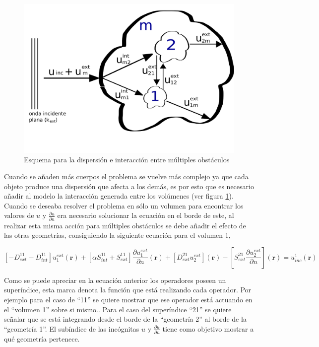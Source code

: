 \documentclass[12pt,letterpaper]{article}
\numberwithin{equation}{section}
\begin{document}
\begin{figure}[H]
	\centering\includegraphics[scale=0.5]{Imagenes/multi_obstaculos.png}
	\caption{Esquema para la dispersión e interacción entre múltiples obstáculos}
	\label{fig:esquema_multi_obstaculos}
\end{figure}

Cuando se añaden más cuerpos el problema se vuelve más complejo ya que cada objeto produce una dispersión que afecta a los demás, es por esto que es necesario añadir al modelo la interacción generada entre los volúmenes \cite{Multiple scattering} (ver figura \ref{fig:esquema_multi_obstaculos}). Cuando se deseaba resolver el problema en sólo un volumen para encontrar los valores de $u$ y $\frac{\partial u}{\partial n}$ era necesario solucionar la ecuación en el borde de este, al realizar esta misma acción para múltiples obstáculos se debe añadir el efecto de las otras geometrías, consiguiendo la siguiente ecuación para el volumen 1,

\begin{equation}
\left[-D_{ext}^{11} - D_{int}^{11}\right] u^{ext}_1(\textbf{r}) + \left[\alpha S_{int}^{11} + S_{ext}^{11}\right]\frac{\partial u^{ext}_1}{\partial n}(\textbf{r}) + \left[D_{ext}^{21} u^{ext}_2\right](\textbf{r}) - \left[S_{ext}^{21} \frac{\partial u^{ext}_2}{\partial n}\right](\textbf{r}) = u_{inc}^1(\textbf{r}) 
\label{eq: multi_trans_1}		
\end{equation}

\pagebreak
Como se puede apreciar en la ecuación anterior los operadores poseen un superíndice, esta marca denota la función que está realizando cada operador. Por ejemplo para el caso de ``11'' se quiere mostrar que ese operador está actuando en el ``volumen 1'' sobre si mismo.. Para el caso del superíndice ``21'' se quiere señalar que se está integrando desde el borde de la ``geometría 2'' al borde de la ``geometría 1''. El subíndice de las incógnitas $u$ y $\frac{\partial u}{\partial n}$ tiene como objetivo mostrar a qué geometría pertenece. 
\end{document}
